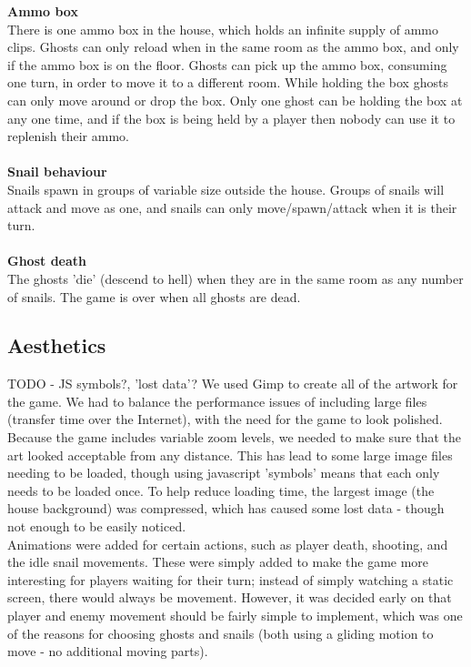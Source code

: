 \documentclass{article}
\begin{document}
\textbf{Ammo box} \\
There is one ammo box in the house, which holds an infinite supply of ammo clips. Ghosts can only reload when in the same room as the ammo box, and only if the ammo box is on the floor. Ghosts can pick up the ammo box, consuming one turn, in order to move it to a different room. While holding the box ghosts can only move around or drop the box. Only one ghost can be holding the box at any one time, and if the box is being held by a player then nobody can use it to replenish their ammo. \\ \\
\textbf{Snail behaviour} \\
Snails spawn in groups of variable size outside the house. Groups of snails will attack and move as one, and snails can only move/spawn/attack when it is their turn. \\ \\
\textbf{Ghost death} \\
The ghosts 'die' (descend to hell) when they are in the same room as any number of snails. The game is over when all ghosts are dead.

\subsection{Aesthetics}
TODO - JS symbols?, 'lost data'?
We used Gimp to create all of the artwork for the game. We had to balance the performance issues of including large files (transfer time over the Internet), with the need for the game to look polished. Because the game includes variable zoom levels, we needed to make sure that the art looked acceptable from any distance. This has lead to some large image files needing to be loaded, though using javascript 'symbols' means that each only needs to be loaded once. To help reduce loading time, the largest image (the house background) was compressed, which has caused some lost data - though not enough to be easily noticed. \\

Animations were added for certain actions, such as player death, shooting, and the idle snail movements. These were simply added to make the game more interesting for players waiting for their turn; instead of simply watching a static screen, there would always be movement. However, it was decided early on that player and enemy movement should be fairly simple to implement, which was one of the reasons for choosing ghosts and snails (both using a gliding motion to move - no additional moving parts).
\end{document}
